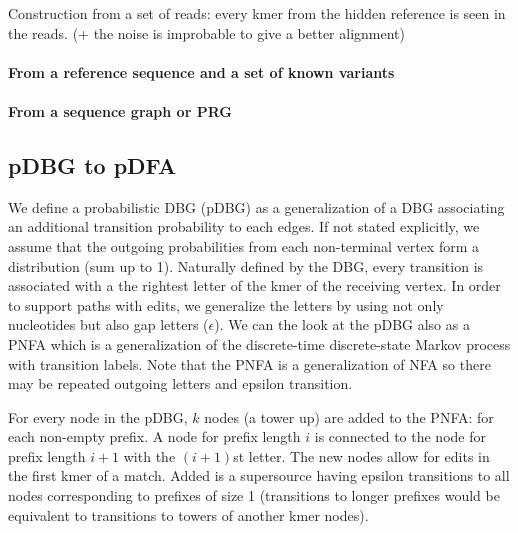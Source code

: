 
Construction from a set of reads: every kmer from the hidden reference is seen in the reads. (+ the noise is improbable to give a better alignment)

\paragraph{From a reference sequence and a set of known variants}

\paragraph{From a sequence graph or PRG}

\subsection{pDBG to pDFA}
We define a probabilistic DBG (pDBG) as a generalization of a DBG associating an additional transition probability to each edges. If not stated explicitly, we assume that the outgoing probabilities from each non-terminal vertex form a distribution (sum up to 1). Naturally defined by the DBG, every transition is associated with a the rightest letter of the kmer of the receiving vertex. In order to support paths with edits, we generalize the letters by using not only nucleotides but also gap letters ($\epsilon$). We can the look at the pDBG also as a PNFA which is a generalization of the discrete-time discrete-state Markov process with transition labels. Note that the PNFA is a generalization of NFA so there may be repeated outgoing letters and epsilon transition.

For every node in the pDBG, $k$ nodes (a tower up) are added to the PNFA: for each non-empty prefix. A node for prefix length $i$ is connected to the node for prefix length $i+1$ with the $(i+1)$st letter. The new nodes allow for edits in the first kmer of a match. Added is a supersource having epsilon transitions to all nodes corresponding to prefixes of size 1 (transitions to longer prefixes would be equivalent to transitions to towers of another kmer nodes).

